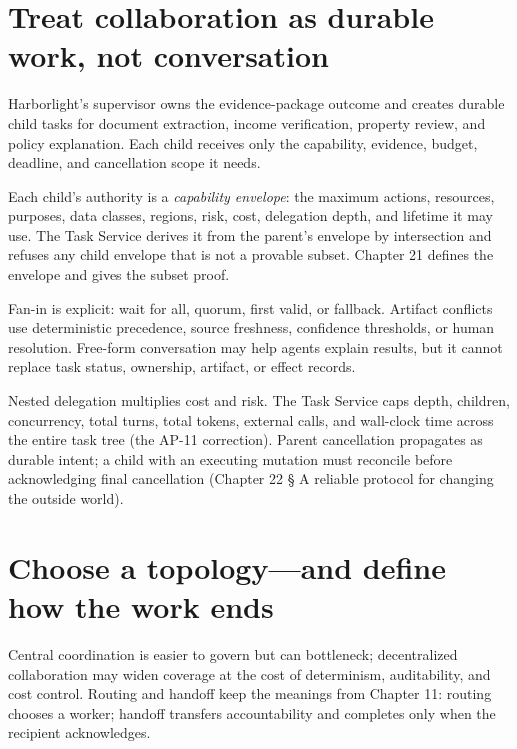 \section{Treat collaboration as durable work, not conversation}


Harborlight’s supervisor owns the evidence-package outcome and creates durable child tasks for document extraction, income verification, property review, and policy explanation. Each child receives only the capability, evidence, budget, deadline, and cancellation scope it needs.\par

Each child's authority is a \emph{capability envelope}: the maximum actions, resources, purposes, data classes, regions, risk, cost, delegation depth, and lifetime it may use. The Task Service derives it from the parent's envelope by intersection and refuses any child envelope that is not a provable subset. Chapter 21 defines the envelope and gives the subset proof.\par

Fan-in is explicit: wait for all, quorum, first valid, or fallback. Artifact conflicts use deterministic precedence, source freshness, confidence thresholds, or human resolution. Free-form conversation may help agents explain results, but it cannot replace task status, ownership, artifact, or effect records.\par

Nested delegation multiplies cost and risk. The Task Service caps depth, children, concurrency, total turns, total tokens, external calls, and wall-clock time across the entire task tree (the AP-11 correction). Parent cancellation propagates as durable intent; a child with an executing mutation must reconcile before acknowledging final cancellation (Chapter 22 § A reliable protocol for changing the outside world).\par

\section{Choose a topology—and define how the work ends}

Central coordination is easier to govern but can bottleneck; decentralized collaboration may widen coverage at the cost of determinism, auditability, and cost control. Routing and handoff keep the meanings from Chapter 11: routing chooses a worker; handoff transfers accountability and completes only when the recipient acknowledges.\par


